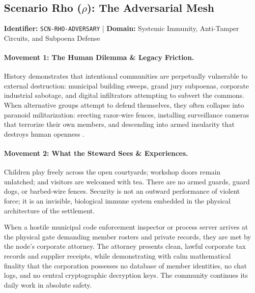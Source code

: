 \subsection{Scenario Rho (\texorpdfstring{$\rho$}{Rho}): The Adversarial Mesh}
\label{subsec:scn_rho}
\textbf{Identifier:} \texttt{SCN-RHO-ADVERSARY} \quad | \quad \textbf{Domain:} Systemic Immunity, Anti-Tamper Circuits, and Subpoena Defense

\paragraph{Movement 1: The Human Dilemma \& Legacy Friction.}
History demonstrates that intentional communities are perpetually vulnerable to external destruction: municipal building sweeps, grand jury subpoenas, corporate industrial sabotage, and digital infiltrators attempting to subvert the commons. When alternative groups attempt to defend themselves, they often collapse into paranoid militarization: erecting razor-wire fences, installing surveillance cameras that terrorize their own members, and descending into armed insularity that destroys human openness \parencite{kanter1972}.

\paragraph{Movement 2: What the Steward Sees \& Experiences.}
Children play freely across the open courtyards; workshop doors remain unlatched; and visitors are welcomed with tea. There are no armed guards, guard dogs, or barbed-wire fences. Security is not an outward performance of violent force; it is an invisible, biological immune system embedded in the physical architecture of the settlement. 

When a hostile municipal code enforcement inspector or process server arrives at the physical gate demanding member rosters and private records, they are met by the node's corporate attorney. The attorney presents clean, lawful corporate tax records and supplier receipts, while demonstrating with calm mathematical finality that the corporation possesses no database of member identities, no chat logs, and no central cryptographic decryption keys. The community continues its daily work in absolute safety.


